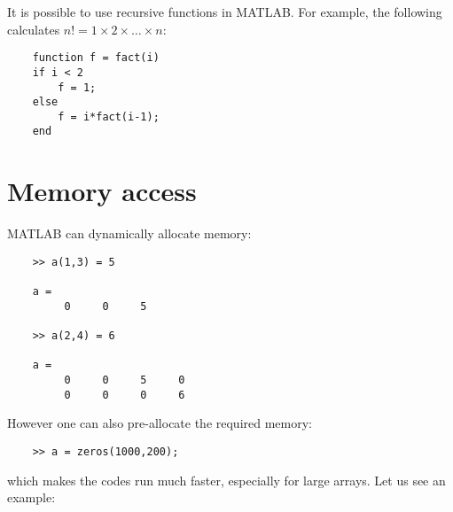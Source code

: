 \documentclass[10pt,a4paper]{article}
\newcounter{example}[section]
\begin{document}
It is possible to use recursive functions in MATLAB. For example, the following calculates $n!=1\times 2 \times \ldots \times n$:
\begin{lstlisting}
	function f = fact(i)
	if i < 2
	    f = 1;
	else
	    f = i*fact(i-1);
	end
\end{lstlisting}

\section{Memory access}
\label{sec:memory}
MATLAB can dynamically allocate memory:
\begin{lstlisting}
	>> a(1,3) = 5
	
	a =
	     0     0     5
	     
	>> a(2,4) = 6
	
	a =
	     0     0     5     0
	     0     0     0     6
\end{lstlisting}
However one can also pre-allocate the required memory:
\begin{lstlisting}
	>> a = zeros(1000,200);
\end{lstlisting}
which makes the codes run much faster, especially for large arrays. Let us see an example:


\end{document}
